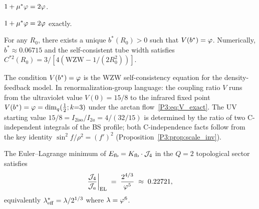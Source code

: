 \begin{lemma}
\label{P3:lem:virial_alg}
$1 + \mu^*\varphi = 2\varphi$.
\end{lemma}

\begin{lemma}
\label{P1:lem:golden}
$1 + \mu^*\varphi = 2\varphi$ exactly.
\end{lemma}

\begin{corollary}
\label{P3:cor:fixedpoint_exists}
For any $R_0$, there exists a unique $b^*(R_0) > 0$ such that
$V(b^*) = \varphi$.  Numerically, $b^* \approx 0.06715$ and the self-consistent
tube width satisfies $C^{*2}(R_0) = 3/[4(\mathrm{WZW} - 1/(2R_0^2))]$.
\end{corollary}

\begin{remark}
\label{P3:rem:fixedpoint_structure}
The condition $V(b^*) = \varphi$ is the WZW self-consistency equation
for the density-feedback model.  In renormalization-group language:
the coupling ratio $V$ runs from the ultraviolet value $V(0) = 15/8$
to the infrared fixed point $V(b^*) = \varphi = \dim_q(\tfrac{1}{2};k{=}3)$
under the arctan flow~\eqref{P3:eq:V_exact}.  The UV starting value
$15/8 = I_{2\mathrm{iso}}/I_{2a} = 4/(32/15)$ is determined by the ratio
of two C-independent integrals of the BS profile; both C-independence
facts follow from the key identity $\sin^2\!f/\rho^2 = (f')^2$
(Proposition~\ref{P3:prop:scale_inv}).
\end{remark}

\begin{conjecture}
\label{P3:conj:lsc}
The Euler--Lagrange minimum of $E_{\mathrm{fb}} = K_{\mathrm{fb}}\cdot\mathcal{J}_4$ in the $Q=2$
topological sector satisfies
\begin{equation}
  \frac{\mathcal{J}_4}{\mathcal{J}_a}\bigg|_{\mathrm{EL}}
  \;=\; \frac{2^{4/3}}{\varphi^5}
  \;\approx\; 0.22721,
  \label{P3:eq:lsc}
\end{equation}
equivalently $\lambda_{\mathrm{eff}}^* = \lambda/2^{1/3}$ where $\lambda = \varphi^6$.
\end{conjecture}

